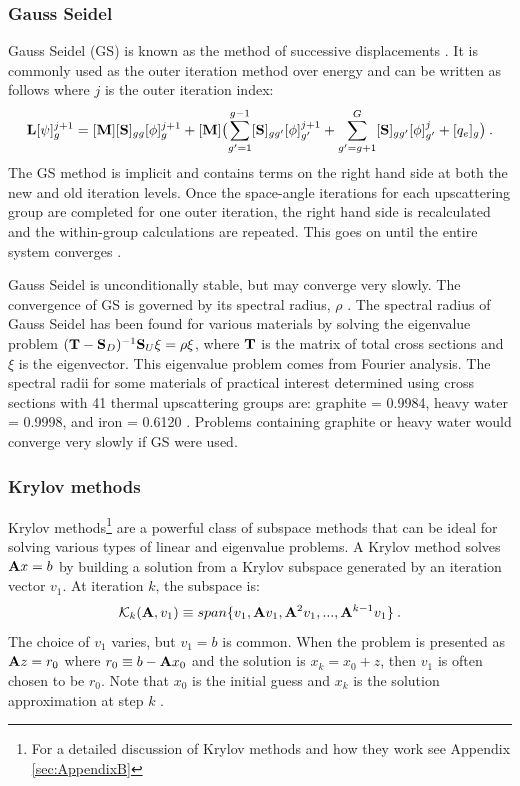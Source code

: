 \subsubsection{Gauss Seidel}
Gauss Seidel (GS) is known as the method of successive displacements \cite{LeVeque2007}. It is commonly used as the outer iteration method over energy and can be written as follows where $j$ is the outer iteration index:
%
\begin{equation}
  \mathbf{L} [\psi]_{g}^{j+1} = [\mathbf{M}] [\mathbf{S}]_{gg}[\phi]_{g}^{j+1} +   [\mathbf{M}]\bigl(\sum_{g'=1}^{g-1} [\mathbf{S}]_{gg'}[\phi]_{g'}^{j+1} + \sum_{g'=g+1}^{G} [\mathbf{S}]_{gg'}[\phi]_{g'}^{j} + [q_{e}]_{g} \bigr) \label{eq:GaussSeidel} \:. 
\end{equation}
%
The GS method is implicit and contains terms on the right hand side at both the new and old iteration levels. Once the space-angle iterations for each upscattering group are completed for one outer iteration, the right hand side is recalculated and the within-group calculations are repeated. This goes on until the entire system converges \cite{Evans2009d}. 

Gauss Seidel is unconditionally stable, but may converge very slowly. The convergence of GS is governed by its spectral radius, $\rho$ \cite{LeVeque2007}. The spectral radius of Gauss Seidel has been found for various materials by solving the eigenvalue problem $(\mathbf{T} - \mathbf{S}_{D})^{-1}\mathbf{S}_{U} \xi = \rho \xi$, where $\mathbf{T}$ is the matrix of total cross sections and $\xi$ is the eigenvector. This eigenvalue problem comes from Fourier analysis. The spectral radii for some materials of practical interest determined using cross sections with 41 thermal upscattering groups are: graphite = 0.9984, heavy water = 0.9998, and iron = 0.6120 \cite{Adams2002}. Problems containing graphite or heavy water would converge very slowly if GS were used.   

\subsubsection{Krylov methods}
Krylov methods\footnote{For a detailed discussion of Krylov methods and how they work see Appendix \ref{sec:AppendixB}} are a powerful class of subspace methods that can be ideal for solving various types of linear and eigenvalue problems. A Krylov method solves $\mathbf{A}x = b$ by building a solution from a Krylov subspace generated by an iteration vector $v_{1}$. At iteration $k$, the subspace is:
%
\begin{equation}
  \mathcal{K}_{k}(\mathbf{A},v_{1}) \equiv span\{v_{1}, \mathbf{A}v_{1}, \mathbf{A}^{2}v_{1}, ..., \mathbf{A}^{k-1}v_{1}\} \:.
  \label{eq:Krylov-subspace}
\end{equation}
%
The choice of $v_{1}$ varies, but $v_{1} = b$ is common. When the problem is presented as $\mathbf{A}z = r_{0}$ where $r_{0} \equiv b - \mathbf{A}x_{0}$ and the solution is $x_{k} = x_{0} + z$, then $v_{1} $ is often chosen to be $r_{0}$. Note that $x_{0}$ is the initial guess and $x_{k}$ is the solution approximation at step $k$  \cite{Ipsen1998}.

